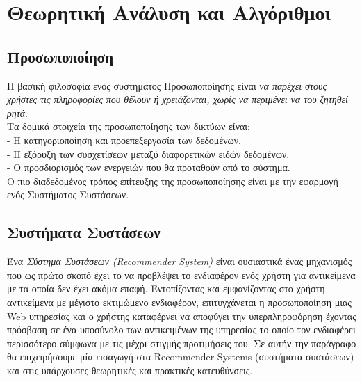 
\chapter{Θεωρητική Ανάλυση και Αλγόριθμοι} %

\label{Θεωριτική Ανάληση} %





\section{Προσωποποίηση}
\noindent
Η βασική φιλοσοφία ενός συστήματος Προσωποποίησης είναι \emph{να παρέχει στους χρήστες
τις πληροφορίες που θέλουν ή χρειάζονται, χωρίς να περιμένει να του ζητηθεί ρητά}.\cite{mulvenna2000personalization}\\
Τα δομικά στοιχεία της προσωποποίησης των δικτύων είναι:\\
- Η κατηγοριοποίηση και προεπεξεργασία των δεδομένων.\\
- H εξόρυξη των συσχετίσεων μεταξύ διαφορετικών ειδών δεδομένων.\\
- Ο προσδιορισμός των ενεργειών που θα προταθούν από το σύστημα.\cite{mobasher2000automatic}\\
Ο πιο διαδεδομένος τρόπος επίτευξης της προσωποποίησης είναι με την εφαρμογή ενός Συστήματος Συστάσεων. 
\cite{eirinaki2003web}



\section{Συστήματα Συστάσεων}
\noindent
Ένα \emph{Σύστημα Συστάσεων (Recommender System)} είναι ουσιαστικά ένας μηχανισμός που
ως πρώτο σκοπό έχει το να προβλέψει το ενδιαφέρον ενός χρήστη για αντικείμενα με τα 
οποία δεν έχει ακόμα επαφή.
Εντοπίζοντας και εμφανίζοντας στο χρήστη αντικείμενα με μέγιστο εκτιμώμενο ενδιαφέρον,
επιτυγχάνεται η προσωποποίηση μιας Web υπηρεσίας και ο χρήστης καταφέρνει να αποφύγει την υπερπληροφόρηση έχοντας πρόσβαση σε ένα υποσύνολο των αντικειμένων
της υπηρεσίας το οποίο τον ενδιαφέρει περισσότερο σύμφωνα με τις μέχρι στιγμής προτιμήσεις του.
Σε αυτήν την παράγραφο θα επιχειρήσουμε μία εισαγωγή στα Recommender Systems (συστήματα συστάσεων) και στις υπάρχουσες θεωρητικές και πρακτικές κατευθύνσεις. 
  
